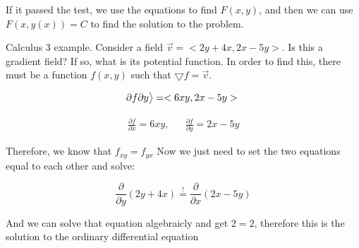    If it passed the test, we use the equations to find $F(x,y)$, and then we can use $F(x,y(x))=C$ to find the solution to the problem.

    \begin{problem}
      Calculus 3 example. Consider a field $\vec{v}=<2y+4x,2x-5y>$. Is this a gradient field? If so, what is its potential function. In order to find this, there must be a function $f(x,y)$ such that $\bigtriangledown f=\vec{v}$.
    
    
      \begin{equation}
        {\partial f}{\partial y}\big>=<6xy,2x-5y>\\
      \end{equation}
  
      \begin{align}
        \frac{\partial f}{\partial x}=6xy,&& \frac{\partial f}{\partial y}=2x-5y
      \end{align}
  
      Therefore, we know that $f_{xy}=f_{yx}$ Now we just need to set the two equations equal to each other and solve:
  
      \begin{equation}
        \frac{\partial}{\partial y}(2y+4x)\stackrel{?}{=}\frac{\partial}{\partial x}(2x-5y)
      \end{equation}
  
      And we can solve that equation algebraicly and get $2=2$, therefore this is the solution to the ordinary differential equation
  
    \end{problem}

